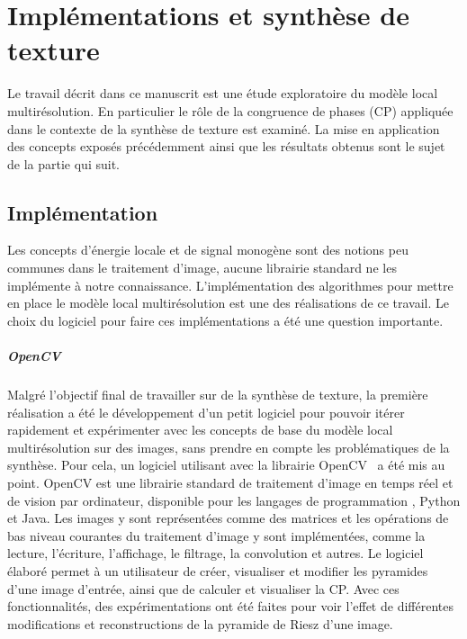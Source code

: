 \chapter{Implémentations et synthèse de texture}
\label{ch:chapitre2}

Le travail décrit dans ce manuscrit est une étude exploratoire du modèle local multirésolution. En particulier le rôle de la congruence de phases (CP) appliquée dans le contexte de la synthèse de texture est examiné. La mise en application des concepts exposés précédemment ainsi que les résultats obtenus sont le sujet de la partie qui suit.

\section{Implémentation}

Les concepts d'énergie locale et de signal monogène sont des notions peu communes dans le traitement d'image, aucune librairie standard ne les implémente à notre connaissance. L'implémentation des algorithmes pour mettre en place le modèle local multirésolution est une des réalisations de ce travail. Le choix du logiciel pour faire ces implémentations a été une question importante.


\paragraph{OpenCV}

Malgré l'objectif final de travailler sur de la synthèse de texture, la première réalisation a été le développement d'un petit logiciel pour pouvoir itérer rapidement et expérimenter avec les concepts de base du modèle local multirésolution sur des images, sans prendre en compte les problématiques de la synthèse. Pour cela, un logiciel utilisant \cpp avec la librairie OpenCV~\cite{opencv_library} a été mis au point. OpenCV est une librairie standard de traitement d'image en temps réel et de vision par ordinateur, disponible pour les langages de programmation \cpp, Python et Java. Les images y sont représentées comme des matrices et les opérations de bas niveau courantes du traitement d'image y sont implémentées, comme la lecture, l'écriture, l'affichage, le filtrage, la convolution et autres. Le logiciel élaboré permet à un utilisateur de créer, visualiser et modifier les pyramides d'une image d'entrée, ainsi que de calculer et visualiser la CP. Avec ces fonctionnalités, des expérimentations ont été faites pour voir l'effet de différentes modifications et reconstructions de la pyramide de Riesz d'une image.

